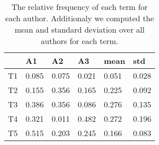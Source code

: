 \documentclass[11pt]{article}
\begin{document}
\begin{table}
\center
\begin{tabular}{|l|l|l|l|l|l|}
\hline
	 & A1 & A2 & A3 & mean & std\\
\hline
	T1 & 0.085 & 0.075 & 0.021 & 0.051 & 0.028\\
\hline
	T2 & 0.155 & 0.356 & 0.165 & 0.225 & 0.092\\
\hline
	T3 & 0.386 & 0.356 & 0.086 & 0.276 & 0.135\\
\hline
	T4 & 0.321 & 0.011 & 0.482 & 0.272 & 0.196\\
\hline
	T5 & 0.515 & 0.203 & 0.245 & 0.166 & 0.083\\
\hline
\end{tabular}
\caption{The relative frequency of each term
for each author. Additionaly we computed
the mean and standard deviation over all
authors for each term.}
\label{table:rel_freq}
\end{table}
\end{document}
